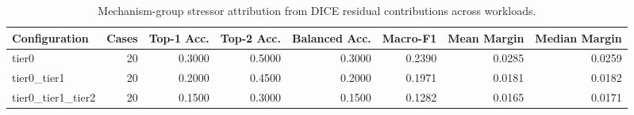 \begin{table}[t]
\centering
\caption{Mechanism-group stressor attribution from DICE residual contributions across workloads.}
\label{tab:dice_stressor_diagnosis}
\footnotesize
\begin{tabular}{lrrrrrrr}
\toprule
Configuration & Cases & Top-1 Acc. & Top-2 Acc. & Balanced Acc. & Macro-F1 & Mean Margin & Median Margin \\
\midrule
tier0 & 20 & 0.3000 & 0.5000 & 0.3000 & 0.2390 & 0.0285 & 0.0259 \\
tier0_tier1 & 20 & 0.2000 & 0.4500 & 0.2000 & 0.1971 & 0.0181 & 0.0182 \\
tier0_tier1_tier2 & 20 & 0.1500 & 0.3000 & 0.1500 & 0.1282 & 0.0165 & 0.0171 \\
\bottomrule
\end{tabular}

\end{table}
